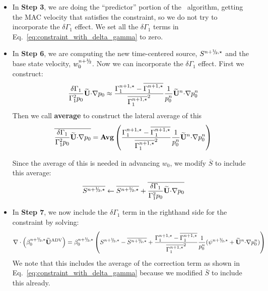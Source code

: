 \begin{itemize}

\item In {\bf Step 3}, we are doing the ``predictor'' portion of the 
\maestroex\ algorithm, getting the MAC velocity that satisfies the constraint, 
so we do not try to incorporate the $\delta \Gamma_1$ effect.  We set
all the $\delta \Gamma_1$ terms in
Eq.~\ref{eq:constraint_with_delta_gamma} to zero.

\item In {\bf Step 6}, we are computing the new time-centered source, 
$S^{\nph,\star}$ and the base state velocity, $w_0^\nph$.  Now we can
incorporate the $\delta \Gamma_1$ effect.  First we construct:
\begin{equation}
\frac{\delta \Gamma_1}{\Gamma_1^2 p_0} \widetilde{{\bf U}} \mathbf{\cdot} \mathbf{\nabla} p_0 \approx
   \frac{\Gamma_1^{n+1,\star} - \overline{\Gamma_1^{n+1,\star}}}
         {{\overline{\Gamma_1^{n+1,\star}}}^2} \frac{1}{p_0^n} \widetilde{{\bf U}}^n \mathbf{\cdot} \mathbf{\nabla} p_0^n
\end{equation}
Then we call {\bf average} to construct the lateral average of this
\begin{equation}
\overline{\frac{\delta \Gamma_1}{\Gamma_1^2 p_0} \widetilde{{\bf U}} \mathbf{\cdot} \mathbf{\nabla} p_0} = 
   \mathbf{Avg} \left (\frac{\Gamma_1^{n+1,\star} - \overline{\Gamma_1^{n+1,\star}}}
         {{\overline{\Gamma_1^{n+1,\star}}}^2} \frac{1}{p_0^n} \widetilde{{\bf U}}^n \mathbf{\cdot} \mathbf{\nabla} p_0^n \right )
\end{equation}

Since the average of this is needed in advancing $w_0$, we modify $\overline{S}$ 
to include this average:
\begin{equation}
\overline{S^{\nph,\star}} \leftarrow \overline{S^{\nph,\star}} + 
   \overline{\frac{\delta \Gamma_1}{\Gamma_1^2 p_0} \Ubt \cdotb \nablab p_0} 
\end{equation}

\item In {\bf Step 7}, we now include the $\delta \Gamma_1$ term in the righthand
side for the constraint by solving:
\begin{equation}
\nabla \cdot \left(\beta_0^{\nph,\star} \uadvtwo\right) =
\beta_0^{\nph,\star}\left( S^{\nph,\star} - \overline{S^{\nph,\star}} +
   \frac{\Gamma_1^{n+1,\star} - \overline{\Gamma_1^{n+1,\star}}} 
         {{\overline{\Gamma_1^{n+1,\star}}}^2} \frac{1}{p_0^n} 
         (\psi^{\nph,\star} + \Ubt^n \cdotb \nablab p_0^n)
\right)
\end{equation}
We note that this includes the average of the correction term as shown
in Eq.~\ref{eq:constraint_with_delta_gamma} because we modified
$\bar{S}$ to include this already.


\end{itemize}
